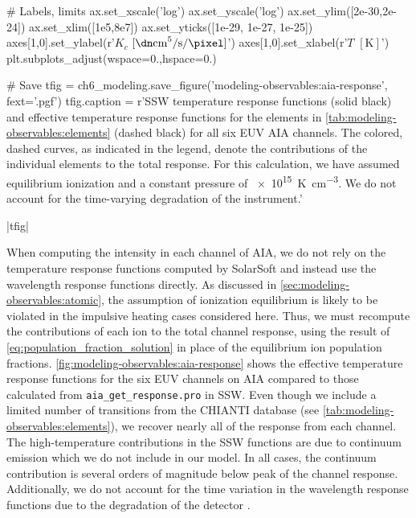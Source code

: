 \begin{pycode}
# Labels, limits
ax.set_xscale('log')
ax.set_yscale('log')
ax.set_ylim([2e-30,2e-24])
ax.set_xlim([1e5,8e7])
ax.set_yticks([1e-29, 1e-27, 1e-25])
axes[1,0].set_ylabel(r'$K_c$ $[\si{\dn\cm\tothe{5}\per\second\per\pixel}]$')
axes[1,0].set_xlabel(r'$T$ $[\si{\kelvin}]$')
plt.subplots_adjust(wspace=0.,hspace=0.)

# Save
tfig = ch6_modeling.save_figure('modeling-observables:aia-response', fext='.pgf')
tfig.caption = r'SSW temperature response functions (solid black) and effective temperature response functions for the elements in \autoref{tab:modeling-observables:elements} (dashed black) for all six EUV AIA channels. The colored, dashed curves, as indicated in the legend, denote the contributions of the individual elements to the total response. For this calculation, we have assumed equilibrium ionization and a constant pressure of \SI{e15}{\kelvin\per\cubic\cm}. We do not account for the time-varying degradation of the instrument.'
\end{pycode}
|tfig|

When computing the intensity in each channel of AIA, we do not rely on the temperature response functions computed by SolarSoft \citep[SSW,][]{freeland_data_1998} and instead use the wavelength response functions directly. As discussed in \autoref{sec:modeling-observables:atomic}, the assumption of ionization equilibrium is likely to be violated in the impulsive heating cases considered here. Thus, we must recompute the contributions of each ion to the total channel response, using the result of \autoref{eq:population_fraction_solution} in place of the equilibrium ion population fractions. \autoref{fig:modeling-observables:aia-response} shows the effective temperature response functions for the six EUV channels on AIA compared to those calculated from \texttt{aia\_get\_response.pro} in SSW. Even though we include a limited number of transitions from the CHIANTI database (see \autoref{tab:modeling-observables:elements}), we recover nearly all of the response from each channel. The high-temperature contributions in the SSW functions are due to continuum emission which we do not include in our model. In all cases, the continuum contribution is several orders of magnitude below peak of the channel response. Additionally, we do not account for the time variation in the wavelength response functions due to the degradation of the detector \citep[see Section 2.1.6 of ][]{boerner_initial_2012}.

